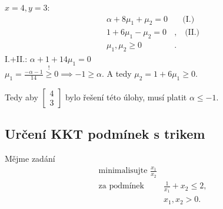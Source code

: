 $x=4, y=3$:
\begin{align*}
    \alpha + 8 \mu_1 + \mu_2 = 0& \quad \text{(I.)}\\
    1 + 6 \mu_1 - \mu_2 = 0&, \quad \text{(II.)}\\
    \mu_1, \mu_2 \geq 0&.
\end{align*}
I.+II.: $\alpha + 1 + 14 \mu_1 = 0$\\
$\mu_1 = \frac{-\alpha - 1}{14} \overset{!}{\geq} 0 \implies -1 \geq \alpha$. A tedy $\mu_2 = 1 + 6 \mu_1 \geq 0$.

Tedy aby
$\begin{bmatrix}
    4 \\
    3
\end{bmatrix}$ bylo řešení této úlohy, musí platit $\alpha \leq -1$.

\subsection{Určení KKT podmínek s trikem}
Mějme zadání
\begin{align*}
    \text{minimalisujte } \frac{x_1}{x_2} \\
    \text{za podmínek } &\frac{1}{x_1} + x_2 \leq 2, \\
    & x_1, x_2 > 0. 
\end{align*}

